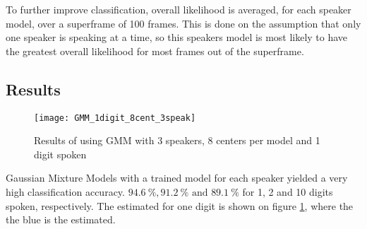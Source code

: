 To further improve classification, overall likelihood is averaged, for each speaker model, over a superframe of 100 frames.
This is done on the assumption that only one speaker is speaking at a time, so this speakers model is most likely to have the greatest overall likelihood for most frames out of the superframe.

\subsection*{Results}
\begin{figure}[H]
\centering
\texttt{[image: GMM\_1digit\_8cent\_3speak]}
\caption{Results of using GMM with 3 speakers, 8 centers per model and 1 digit spoken}
\label{fig:GMM_fig_1}
\end{figure}

Gaussian Mixture Models with a trained model for each speaker yielded a very high classification accuracy. $  94.6\ \%, 91.2\ \% \text{ and }  89.1\ \% $ for 1, 2 and 10 digits spoken, respectively.
The estimated for one digit is shown on figure \ref{fig:GMM_fig_1}, where the the blue is the estimated. 


